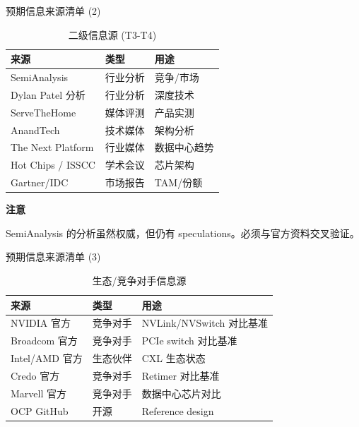 \documentclass[UTF8,11pt,aspectratio=169]{beamer}
\newenvironment{warningblock}{
    \begin{alertblock}{\textbf{\twemoji{warning} 注意}}
}{
    \end{alertblock}
}
\begin{document}
\begin{frame}{预期信息来源清单 (2)}
    \begin{table}
        \centering
        \caption{二级信息源 (T3-T4)}
        \begin{tabular}{lll}
            \toprule
            \textbf{来源} & \textbf{类型} & \textbf{用途} \\
            \midrule
            SemiAnalysis & 行业分析 & 竞争/市场 \\
            Dylan Patel 分析 & 行业分析 & 深度技术 \\
            ServeTheHome & 媒体评测 & 产品实测 \\
            AnandTech & 技术媒体 & 架构分析 \\
            The Next Platform & 行业媒体 & 数据中心趋势 \\
            Hot Chips / ISSCC & 学术会议 & 芯片架构 \\
            Gartner/IDC & 市场报告 & TAM/份额 \\
            \bottomrule
        \end{tabular}
    \end{table}

    \begin{warningblock}
        SemiAnalysis 的分析虽然权威，但仍有 speculations。必须与官方资料交叉验证。
    \end{warningblock}
\end{frame}

\begin{frame}{预期信息来源清单 (3)}
    \begin{table}
        \centering
        \caption{生态/竞争对手信息源}
        \begin{tabular}{lll}
            \toprule
            \textbf{来源} & \textbf{类型} & \textbf{用途} \\
            \midrule
            NVIDIA 官方 & 竞争对手 & NVLink/NVSwitch 对比基准 \\
            Broadcom 官方 & 竞争对手 & PCIe switch 对比基准 \\
            Intel/AMD 官方 & 生态伙伴 & CXL 生态状态 \\
            Credo 官方 & 竞争对手 & Retimer 对比基准 \\
            Marvell 官方 & 竞争对手 & 数据中心芯片对比 \\
            OCP GitHub & 开源 & Reference design \\
            \bottomrule
        \end{tabular}
    \end{table}
\end{frame}
\end{document}

